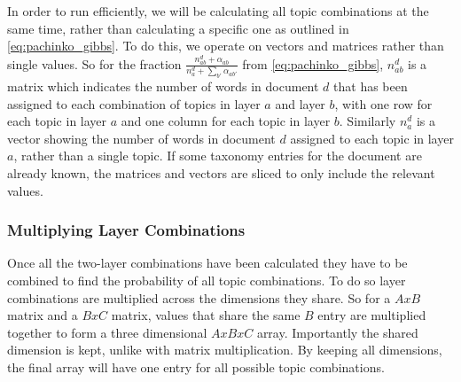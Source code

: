 In order to run efficiently, we will be calculating all topic combinations at the same time, rather than calculating a specific one as outlined in \autoref{eq:pachinko_gibbs}.
To do this, we operate on vectors and matrices rather than single values.
So for the fraction $\frac{n_{ab}^d + \alpha_{ab}}{n_a^d + \sum_{b'} \alpha_{ab'}}$ from \autoref{eq:pachinko_gibbs}, $n_{ab}^d$ is a matrix which indicates the number of words in document $d$ that has been assigned to each combination of topics in layer $a$ and layer $b$, with one row for each topic in layer $a$ and one column for each topic in layer $b$.
Similarly $n_a^d$ is a vector showing the number of words in document $d$ assigned to each topic in layer $a$, rather than a single topic.
If some taxonomy entries for the document are already known, the matrices and vectors are sliced to only include the relevant values.

\subsubsection{Multiplying Layer Combinations}
Once all the two-layer combinations have been calculated they have to be combined to find the probability of all topic combinations.
To do so layer combinations are multiplied across the dimensions they share.
So for a $AxB$ matrix and a $BxC$ matrix, values that share the same $B$ entry are multiplied together to form a three dimensional $AxBxC$ array.
Importantly the shared dimension is kept, unlike with matrix multiplication.
By keeping all dimensions, the final array will have one entry for all possible topic combinations.

